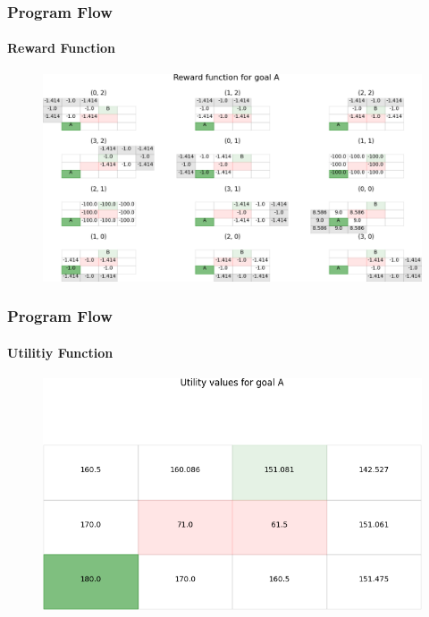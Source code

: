 \documentclass[11pt]{beamer}
\begin{document}
\begin{frame}
	\frametitle{Program Flow}
	\framesubtitle{Reward Function}
	
\begin{figure}
	\centering
	\includegraphics[width=\linewidth]{res/A_reward}
\end{figure}
\end{frame}

\begin{frame}
	\frametitle{Program Flow}
	\framesubtitle{Utilitiy Function}

\begin{figure}
	\centering
	\includegraphics[width=\linewidth]{res/A_utilities}
\end{figure}
\end{frame}
\end{document}
